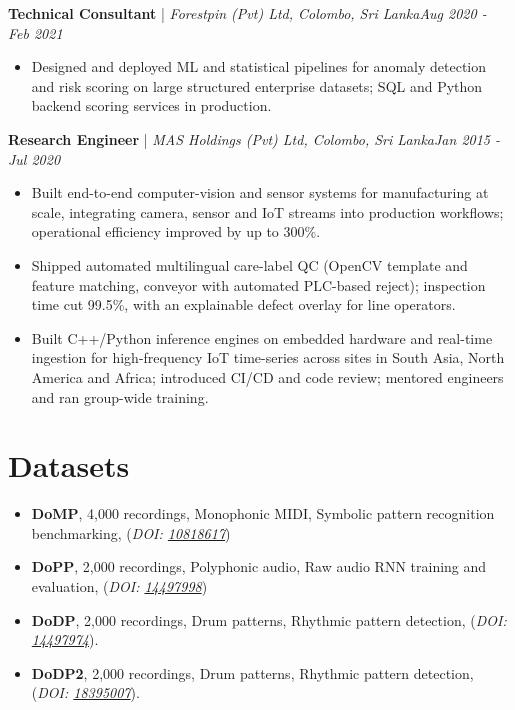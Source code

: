 \documentclass[11pt]{article}
\newenvironment{cvrole}[5]{%
  \par\noindent\textbf{\large #1} | \textit{\small #2, #3}\hfill \textit{\small #4 - #5}\par
  \begin{itemize}[leftmargin=2em, itemsep=-0.3em, topsep=-0.5em]%
}{%
  \end{itemize}\par\noindent\mbox{}\par\vspace{0.1em}%
}
\begin{document}
\begin{cvrole}{Technical Consultant}{Forestpin (Pvt) Ltd}{Colombo, Sri Lanka}{Aug 2020}{Feb 2021}
    \item Designed and deployed ML and statistical pipelines for anomaly detection and risk scoring on large structured enterprise datasets; SQL and Python backend scoring services in production.
\end{cvrole}

\begin{cvrole}{Research Engineer}{MAS Holdings (Pvt) Ltd}{Colombo, Sri Lanka}{Jan 2015}{Jul 2020}
    \item Built end-to-end computer-vision and sensor systems for manufacturing at scale, integrating camera, sensor and IoT streams into production workflows; operational efficiency improved by up to 300\%.
    \item Shipped automated multilingual care-label QC (OpenCV template and feature matching, conveyor with automated PLC-based reject); inspection time cut 99.5\%, with an explainable defect overlay for line operators.
    \item Built C++/Python inference engines on embedded hardware and real-time ingestion for high-frequency IoT time-series across sites in South Asia, North America and Africa; introduced CI/CD and code review; mentored engineers and ran group-wide training.
\end{cvrole}

\section*{Datasets}
\begin{itemize}[leftmargin=1.2em, itemsep=-0.25em]
    \item \textbf{DoMP}, 4,000 recordings, Monophonic MIDI, Symbolic pattern recognition benchmarking, (\textit{DOI: \href{https://doi.org/10.5281/zenodo.10818617 }{\textit{10818617}}})
    \item \textbf{DoPP}, 2,000 recordings, Polyphonic audio, Raw audio RNN training and evaluation, (\textit{DOI: \href{https://doi.org/10.5281/zenodo.14497998 }{\textit{14497998}}})
    \item \textbf{DoDP}, 2,000 recordings, Drum patterns, Rhythmic pattern detection, (\textit{DOI: \href{https://doi.org/10.5281/zenodo.14497974 }{\textit{14497974}}}).
    \item \textbf{DoDP2}, 2,000 recordings, Drum patterns, Rhythmic pattern detection, (\textit{DOI: \href{https://doi.org/10.5281/zenodo.18395007 }{\textit{18395007}}}).
\end{itemize}
\end{document}
